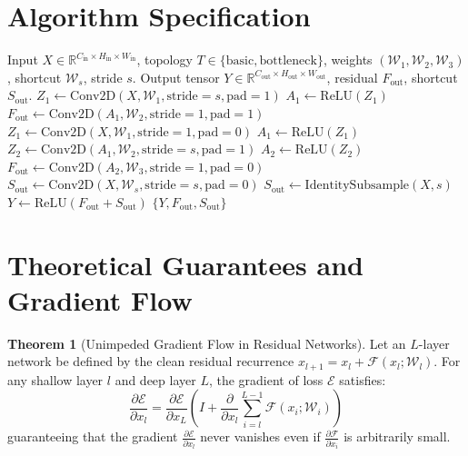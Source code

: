 \documentclass[11pt,a4paper]{article}
\theoremstyle{definition}
\newtheorem{theorem}{Theorem}[section]
\begin{document}
\section{Algorithm Specification}

\begin{algorithm}[H]
\caption{ResNet Residual Block Forward Pass}
\label{alg:resnet_block}
\begin{algorithmic}[1]
\Require Input $X \in \mathbb{R}^{C_{\text{in}} \times H_{\text{in}} \times W_{\text{in}}}$, topology $T \in \{\text{basic}, \text{bottleneck}\}$, weights $(\mathcal{W}_1, \mathcal{W}_2, \mathcal{W}_3)$, shortcut $\mathcal{W}_s$, stride $s$.
\Ensure Output tensor $Y \in \mathbb{R}^{C_{\text{out}} \times H_{\text{out}} \times W_{\text{out}}}$, residual $F_{\text{out}}$, shortcut $S_{\text{out}}$.
    \State $Z_1 \gets \text{Conv2D}(X, \mathcal{W}_1, \text{stride}=s, \text{pad}=1)$
    \State $A_1 \gets \text{ReLU}(Z_1)$
    \State $F_{\text{out}} \gets \text{Conv2D}(A_1, \mathcal{W}_2, \text{stride}=1, \text{pad}=1)$
\Else
    \State $Z_1 \gets \text{Conv2D}(X, \mathcal{W}_1, \text{stride}=1, \text{pad}=0)$
    \State $A_1 \gets \text{ReLU}(Z_1)$
    \State $Z_2 \gets \text{Conv2D}(A_1, \mathcal{W}_2, \text{stride}=s, \text{pad}=1)$
    \State $A_2 \gets \text{ReLU}(Z_2)$
    \State $F_{\text{out}} \gets \text{Conv2D}(A_2, \mathcal{W}_3, \text{stride}=1, \text{pad}=0)$
\EndIf
{}
    \State $S_{\text{out}} \gets \text{Conv2D}(X, \mathcal{W}_s, \text{stride}=s, \text{pad}=0)$
\Else
    \State $S_{\text{out}} \gets \text{IdentitySubsample}(X, s)$
\EndIf
\State $Y \gets \text{ReLU}(F_{\text{out}} + S_{\text{out}})$
\State \Return $\{Y, F_{\text{out}}, S_{\text{out}}\}$
\end{algorithmic}
\end{algorithm}

\section{Theoretical Guarantees and Gradient Flow}

\begin{theorem}[Unimpeded Gradient Flow in Residual Networks]
Let an $L$-layer network be defined by the clean residual recurrence $x_{l+1} = x_l + \mathcal{F}(x_l; \mathcal{W}_l)$. For any shallow layer $l$ and deep layer $L$, the gradient of loss $\mathcal{E}$ satisfies:
\begin{equation}
\frac{\partial \mathcal{E}}{\partial x_l} = \frac{\partial \mathcal{E}}{\partial x_L} \left( I + \frac{\partial}{\partial x_l} \sum_{i=l}^{L-1} \mathcal{F}(x_i; \mathcal{W}_i) \right)
\end{equation}
guaranteeing that the gradient $\frac{\partial \mathcal{E}}{\partial x_l}$ never vanishes even if $\frac{\partial \mathcal{F}}{\partial x_i}$ is arbitrarily small.
\end{theorem}
\end{document}
